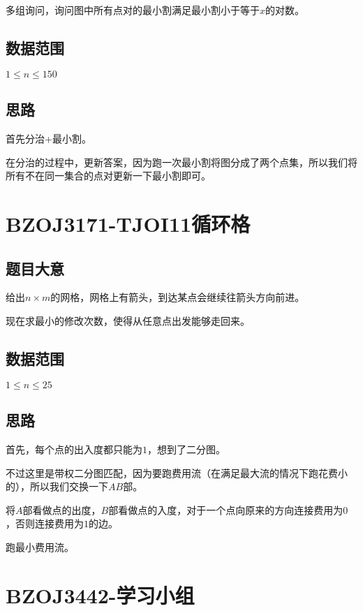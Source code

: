 \documentclass{ctexart}
\numberwithin{equation}{section}
\begin{document}
\begin{flushleft}
  多组询问，询问图中所有点对的最小割满足最小割小于等于$x$的对数。
  
    
  \subsection{数据范围}
  $1\le n \le 150$
  \subsection{思路}
  首先分治+最小割。

  在分治的过程中，更新答案，因为跑一次最小割将图分成了两个点集，所以我们将所有不在同一集合的点对更新一下最小割即可。
  
  \newpage

  \section{BZOJ3171-TJOI11循环格}
  \subsection{题目大意}
  给出$n\times m$的网格，网格上有箭头，到达某点会继续往箭头方向前进。

  现在求最小的修改次数，使得从任意点出发能够走回来。
  
    
  \subsection{数据范围}
  $1\le n \le 25$
  \subsection{思路}
  首先，每个点的出入度都只能为$1$，想到了二分图。

  不过这里是带权二分图匹配，因为要跑费用流（在满足最大流的情况下跑花费小的），所以我们交换一下$AB$部。

  将$A$部看做点的出度，$B$部看做点的入度，对于一个点向原来的方向连接费用为$0$，否则连接费用为$1$的边。

  跑最小费用流。
  
  \newpage

  \section{BZOJ3442-学习小组}

\end{flushleft}
\end{document}
